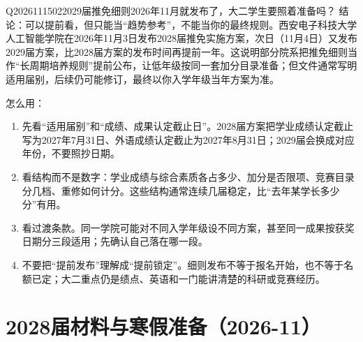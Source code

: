 \begin{qa}{Q2026111502}{2029届推免细则2026年11月就发布了，大二学生要照着准备吗？}
结论：可以提前看，但只能当“趋势参考”，不能当你的最终规则。西安电子科技大学人工智能学院在2026年11月3日发布2028届推免实施方案，次日（11月4日）又发布2029届方案，比2028届方案的发布时间再提前一年。这说明部分院系把推免细则当作“长周期培养规则”提前公布，让低年级按同一套加分目录准备；但文件通常写明适用届别，后续仍可能修订，最终以你入学年级当年方案为准。

怎么用：

\begin{enumerate}
\item 先看“适用届别”和“成绩、成果认定截止日”。2028届方案把学业成绩认定截止写为2027年7月31日、外语成绩认定截止为2027年8月31日；2029届会换成对应年份，不要照抄日期。
\item 看结构而不是数字：学业成绩与综合素质各占多少、加分是否限项、竞赛目录分几档、重修如何计分。这些结构通常连续几届稳定，比“去年某学长多少分”有用。
\item 看过渡条款。同一学院可能对不同入学年级设不同方案，甚至同一成果按获奖日期分三段适用；先确认自己落在哪一段。
\item 不要把“提前发布”理解成“提前锁定”。细则发布不等于报名开始，也不等于名额已定；大二重点仍是绩点、英语和一门能讲清楚的科研或竞赛经历。
\end{enumerate}
\end{qa}
\section{2028届材料与寒假准备（2026-11）}

